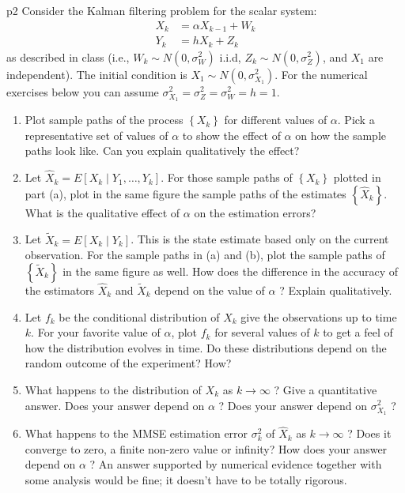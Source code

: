 \documentclass[a4paper, 11pt]{article}
\begin{document}
\begin{problem}{%
    }{p2%
    }
Consider the Kalman filtering problem for the scalar system:
$$
\begin{aligned}
	X_k & =\alpha X_{k-1}+W_k \\
	Y_k & =h X_k+Z_k
\end{aligned}
$$
as described in class (i.e., $W_k \sim N\left(0, \sigma_W^2\right)$ i.i.d, $Z_k \sim N\left(0, \sigma_Z^2\right)$, and $X_1$ are independent). The initial condition is $X_1 \sim N\left(0, \sigma_{X_1}^2\right)$. For the numerical exercises below you can assume $\sigma_{X_1}^2=\sigma_Z^2=\sigma_W^2=h=1$.\begin{enumerate}[label=(\alph*)]
	\item Plot sample paths of the process $\left\{X_k\right\}$ for different values of $\alpha$. Pick a representative set of values of $\alpha$ to show the effect of $\alpha$ on how the sample paths look like. Can you explain qualitatively the effect?
\item Let $\hat{X}_k=E\left[X_k \mid Y_1, \ldots, Y_k\right]$. For those sample paths of $\left\{X_k\right\}$ plotted in part (a), plot in the same figure the sample paths of the estimates $\left\{\hat{X}_k\right\}$. What is the qualitative effect of $\alpha$ on the estimation errors?
\item Let $\tilde{X}_k=E\left[X_k \mid Y_k\right]$. This is the state estimate based only on the current observation. For the sample paths in (a) and (b), plot the sample paths of $\left\{\tilde{X}_k\right\}$ in the same figure as well. How does the difference in the accuracy of the estimators $\hat{X}_k$ and $\tilde{X}_k$ depend on the value of $\alpha$ ? Explain qualitatively.
\item Let $f_k$ be the conditional distribution of $X_k$ give the observations up to time $k$. For your favorite value of $\alpha$, plot $f_k$ for several values of $k$ to get a feel of how the distribution evolves in time. Do these distributions depend on the random outcome of the experiment? How?
\item What happens to the distribution of $X_k$ as $k \rightarrow \infty$ ? Give a quantitative answer. Does your answer depend on $\alpha$ ? Does your answer depend on $\sigma_{X_1}^2$ ?
\item What happens to the MMSE estimation error $\sigma_k^2$ of $\hat{X}_k$ as $k \rightarrow \infty$ ? Does it converge to zero, a finite non-zero value or infinity? How does your answer depend on $\alpha$ ? An answer supported by numerical evidence together with some analysis would be fine; it doesn't have to be totally rigorous.
\end{enumerate}
\end{problem}
\end{document}
